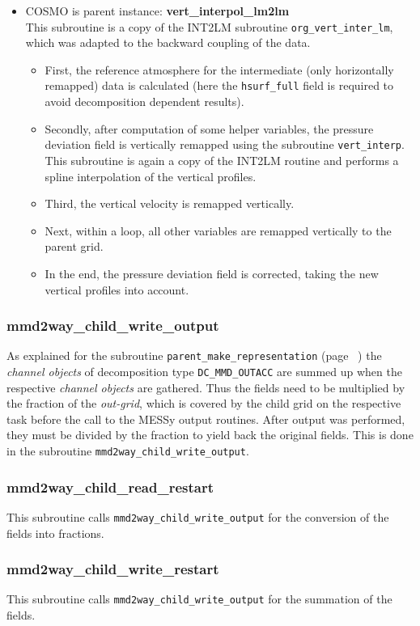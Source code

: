 \documentclass[11pt,twoside]{article}
\begin{document}
\begin{itemize}
\item COSMO is parent instance: {\bf vert\_interpol\_lm2lm}\\
This subroutine is a copy of the INT2LM
subroutine \verb|org_vert_inter_lm|,
which was adapted to the backward coupling of the data.
\begin{itemize}
\item First, the reference atmosphere for the intermediate (only
horizontally remapped) data is calculated (here
the \verb|hsurf_full| field is required to avoid decomposition
dependent results).
\item Secondly, after computation of some helper variables, the pressure
deviation field is vertically remapped using the
subroutine \verb|vert_interp|. This subroutine is again a copy of the
INT2LM routine and performs a spline interpolation of the vertical
profiles.
\item Third, the vertical velocity is remapped vertically.
\item Next, within a loop, all other variables are 
remapped vertically to the parent grid.
\item In the end, the pressure deviation field is corrected, taking the new
vertical profiles into account.
\end{itemize}

\end{itemize}
\subsubsection{mmd2way\_child\_write\_output}
As explained for the subroutine \verb|parent_make_representation|
(page \ \pageref{makeprepr}) the {\it channel objects} of
decomposition type \verb|DC_MMD_OUTACC| are summed up when the respective
{\it channel objects} are gathered.
Thus the fields need to be multiplied by the fraction of the {\it out-grid},
which is covered by the child grid on the respective task before the call to
the MESSy output routines. After output was performed, 
 they must be divided by the fraction to yield back the original fields.
This is done in the subroutine \verb|mmd2way_child_write_output|.

\subsubsection{mmd2way\_child\_read\_restart}
This subroutine calls \verb|mmd2way_child_write_output| for the
conversion of the fields into fractions.
\subsubsection{mmd2way\_child\_write\_restart}
This subroutine calls \verb|mmd2way_child_write_output| for the summation of
the fields.
\end{document}
